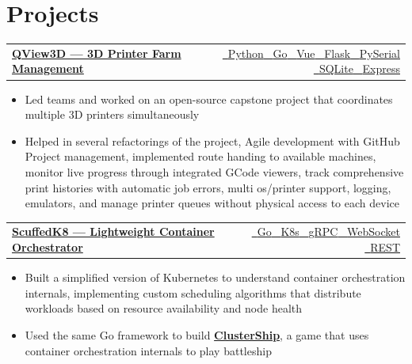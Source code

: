 \documentclass[letterpaper,10pt]{article}
\makeatletter
\newenvironment{ProjectNotes}{%
  \begingroup\fontsize{9.5}{11}\selectfont
  \begin{itemize}[label=--,leftmargin=0.2in,topsep=2pt,itemsep=2pt,parsep=0pt,partopsep=0pt]
}{%
  \end{itemize}\endgroup\vspace{4pt}
}
\newcommand{\TechTag}[1]{{\footnotesize #1}}
\newcommand{\IconTag}[2]{#1\ \TechTag{#2}}
\providecommand{\icPy}{\faIcon{python}}
\providecommand{\icGo}{\faIcon{golang}}
\providecommand{\icJS}{\faIcon{js-square}}
\providecommand{\icVue}{\faIcon{vuejs}}
\providecommand{\icFlask}{\faIcon{flask}}
\providecommand{\icWS}{\faIcon{plug}}
\providecommand{\icGRPC}{\faIcon{exchange-alt}}
\providecommand{\icREST}{\faIcon{cloud}}
\providecommand{\icSerial}{\faIcon{usb}}
\providecommand{\icSQLite}{\faIcon{database}}
\providecommand{\icKube}{\faIcon{dharmachakra}}
\newcommand{\ProjectRow}[4]{%
  \vspace{0pt}
  \begin{tabular*}{\textwidth}{@{}l@{\extracolsep{\fill}}r@{}}
    \textbf{\href{#2}{#1}} & {\footnotesize \href{#3}{#4}}
  \end{tabular*}\par
  \vspace{-1pt}
}
\makeatother
\begin{document}
\section{Projects}
\vspace{-1pt}

\ProjectRow{QView3D — 3D Printer Farm Management}
{https://github.com/sunyhydralab/QView3D}
{github.com/sunyhydralab/QView3D}
{\IconTag{\icPy}{Python} \IconTag{\icGo}{Go} \IconTag{\icVue}{Vue} \IconTag{\icFlask}{Flask} \IconTag{\icSerial}{PySerial} \IconTag{\icSQLite}{SQLite} \IconTag{\icJS}{Express}}
\begin{ProjectNotes}
  \item Led teams and worked on an open-source capstone project that coordinates multiple 3D printers simultaneously
  \item Helped in several refactorings of the project, Agile development with GitHub Project management, implemented route handing to available machines, monitor live progress through integrated GCode viewers, track comprehensive print histories with automatic job errors, multi os/printer support, logging, emulators, and manage printer queues without physical access to each device
\end{ProjectNotes}

\ProjectRow{ScuffedK8 — Lightweight Container Orchestrator}
{https://github.com/ndg8743/ScuffedK8}
{github.com/ndg8743/ScuffedK8}
{\IconTag{\icGo}{Go} \IconTag{\icKube}{K8s} \IconTag{\icGRPC}{gRPC} \IconTag{\icWS}{WebSocket} \IconTag{\icREST}{REST}}
\begin{ProjectNotes}
  \item Built a simplified version of Kubernetes to understand container orchestration internals, implementing custom scheduling algorithms that distribute workloads based on resource availability and node health
  \item Used the same Go framework to build \href{https://github.com/ndg8743/ClusterShip}{\textbf{ClusterShip}}, a game that uses container orchestration internals to play battleship
\end{ProjectNotes}
\end{document}
